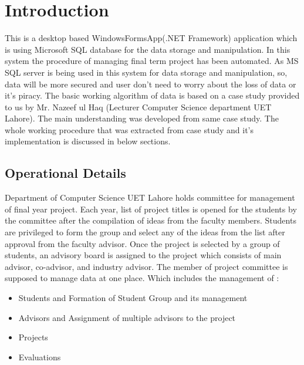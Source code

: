 
\chapter{Introduction} %
\label{Chapter1}

{
This is a desktop based WindowsFormsApp(.NET Framework) application which is using Microsoft SQL database for the data storage and manipulation. In this system the procedure of managing final term project has been automated. As MS SQL server is being used in this system for data storage and manipulation, so, data will be more secured and user don't need to worry about the loss of data or it's piracy.
The basic working algorithm of data is based on a case study provided to us by Mr. Nazeef ul Haq (Lecturer Computer Science department UET Lahore). The main understanding was developed from same case study. The whole working procedure that was extracted from case study and it's implementation is discussed in below sections.
}
\section{Operational Details}
{
Department of Computer Science UET Lahore holds committee for management of final year project. Each year, 
list of project titles is opened for the students by the committee after the compilation of ideas from the faculty 
members. Students are privileged to form the group and select any of the ideas from the list after approval from 
the faculty advisor. Once the project is selected by a group of students, an advisory board is assigned to the project 
which consists of main advisor, co-advisor, and industry advisor. The member of project committee is supposed to manage data at one place. Which includes the management of :
\begin{itemize}
    \item Students  and Formation of Student Group and its management 
    \item Advisors  and Assignment of multiple advisors to the project 
    \item Projects 
    
    \item Evaluations
    
\end{itemize}
}
